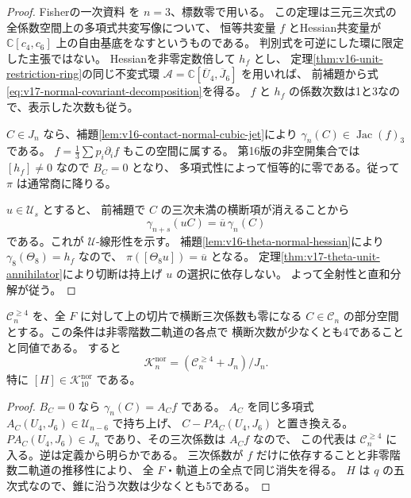 \begin{proof}
Fisherの一次資料\cite[Definition~2.5, Lemma~2.6, Theorem~2.7(i)]{FisherHessian2012}
を $n=3$、標数零で用いる。
この定理は三元三次式の全係数空間上の多項式共変写像について、
恒等共変量 $f$ とHessian共変量が
$\mathbb C[c_4,c_6]$ 上の自由基底をなすというものである。
判別式を可逆にした環に限定した主張ではない。
Hessianを非零定数倍して $h_f$ とし、
定理\ref{thm:v16-unit-restriction-ring}の同じ不変式環
$\mathcal A=\mathbb C[\overline U_4,\overline J_6]$ を用いれば、
前補題から式\eqref{eq:v17-normal-covariant-decomposition}を得る。
$f$ と $h_f$ の係数次数は1と3なので、表示した次数も従う。

$C\in J_n$ なら、補題\ref{lem:v16-contact-normal-cubic-jet}により
$\gamma_n(C)\in\operatorname{Jac}(f)_3$ である。
$f=\frac13\sum p_i\partial_i f$ もこの空間に属する。
第16版の非空開集合では $[h_f]\ne0$ なので $B_C=0$ となり、
多項式性によって恒等的に零である。従って $\pi$ は通常商に降りる。

$u\in\mathcal U_s$ とすると、
前補題で $C$ の三次未満の横断項が消えることから
\[
 \gamma_{n+s}(uC)=\overline u\,\gamma_n(C)
\]
である。これが $\mathcal U$-線形性を示す。
補題\ref{lem:v16-theta-normal-hessian}により $\gamma_8(\Theta_8)=h_f$ なので、
$\pi([\Theta_8u])=\overline u$ となる。
定理\ref{thm:v17-theta-unit-annihilator}により切断は持上げ $u$ の選択に依存しない。
よって全射性と直和分解が従う。
\end{proof}

\begin{proposition}[未知の部分は横断四次以上で表せる]
\label{prop:v17-normal-invisible-representatives}
$\mathcal C_n^{\ge4}$ を、全 $F$ に対して上の切片で横断三次係数も零になる
$C\in\mathcal C_n$ の部分空間とする。この条件は非零階数二軌道の各点で
横断次数が少なくとも4であることと同値である。
すると
\begin{equation}\label{eq:v17-normal-invisible-representatives}
 \mathcal K_n^{\mathrm{nor}}
 =(\mathcal C_n^{\ge4}+J_n)/J_n.
\end{equation}
特に $[H]\in\mathcal K_{10}^{\mathrm{nor}}$ である。
\end{proposition}

\begin{proof}
$B_C=0$ なら $\gamma_n(C)=A_C f$ である。
$A_C$ を同じ多項式 $A_C(U_4,J_6)\in\mathcal U_{n-6}$ で持ち上げ、
$C-PA_C(U_4,J_6)$ と置き換える。
$PA_C(U_4,J_6)\in J_n$ であり、その三次係数は $A_Cf$ なので、
この代表は $\mathcal C_n^{\ge4}$ に入る。逆は定義から明らかである。
三次係数が $f$ だけに依存することと非零階数二軌道の推移性により、
全 $F$・軌道上の全点で同じ消失を得る。
$H$ は $q$ の五次式なので、錐に沿う次数は少なくとも5である。
\end{proof}

